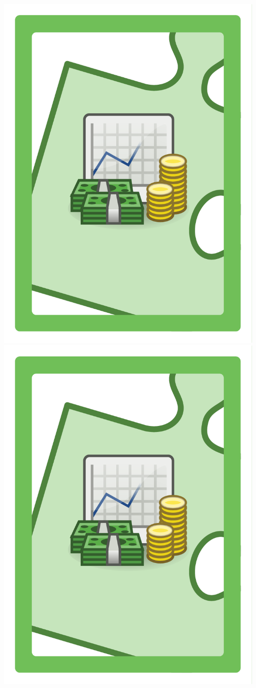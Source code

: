 \documentclass{letter}
\begin{document}
\includegraphics{lo0t/lo0t.shares_financial}
\includegraphics{lo0t/lo0t.shares_financial}
\end{document}
